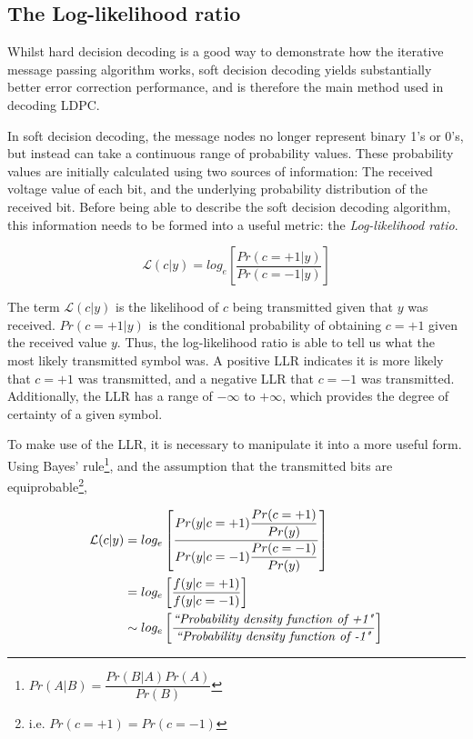 \documentclass[11pt]{article}
\numberwithin{equation}{subsection}
\begin{document}
\subsection{The Log-likelihood ratio} \label{section:LLR}
Whilst hard decision decoding is a good way to demonstrate how the iterative message passing algorithm works, soft decision decoding yields substantially better error correction performance, and is therefore the main method used in decoding LDPC.

In soft decision decoding, the message nodes no longer represent binary 1's or 0's, but instead can take a continuous range of probability values. These probability values are initially calculated using two sources of information: The received voltage value of each bit, and the underlying probability distribution of the received bit. Before being able to describe the soft decision decoding algorithm, this information needs to be formed into a useful metric: the \textit{Log-likelihood ratio}.

\begin{equation} \label{eq:LLR}
\mathcal{L}(c|y) = log_e \left[ \dfrac{Pr(c=+1|y)}{Pr(c=-1|y)} \right]
\end{equation}

\noindent The term $\mathcal{L}(c|y)$ \cite{cho2012analysis} is the likelihood of $c$ being transmitted given that $y$ was received. $Pr(c=+1|y)$ is the conditional probability of obtaining $c=+1$ given the received value $y$. Thus, the log-likelihood ratio is able to tell us what the most likely transmitted symbol was. A positive LLR indicates it is more likely that $c=+1$ was transmitted, and a negative LLR that $c=-1$ was transmitted. Additionally, the LLR has a range of $-\infty$ to $+\infty$, which provides the degree of certainty of a given symbol.

To make use of the LLR, it is necessary to manipulate it into a more useful form. Using Bayes' rule\footnote{$Pr(A|B) = \dfrac{Pr(B|A) Pr(A)}{Pr(B)}$}, and the assumption that the transmitted bits are equiprobable\footnote{i.e. $Pr(c=+1) = Pr(c=-1)$},

\begin{equation}
\begin{aligned}
\mathcal{L}(c|y) &= log_e \left[ \dfrac{Pr(y|c=+1) \dfrac{Pr(c=+1)}{Pr(y)}}{Pr(y|c=-1) \dfrac{Pr(c=-1)}{Pr(y)}} \right] 
\\
&= log_e \left[ \dfrac{f(y|c=+1)} {f(y|c=-1)} \right] 
\\
&\sim log_e \left[ \dfrac{\text{\textit{``Probability density function of +1"}}}{\text{\textit{``Probability density function of -1"}}} \right]
\end{aligned}
\end{equation}
\end{document}
